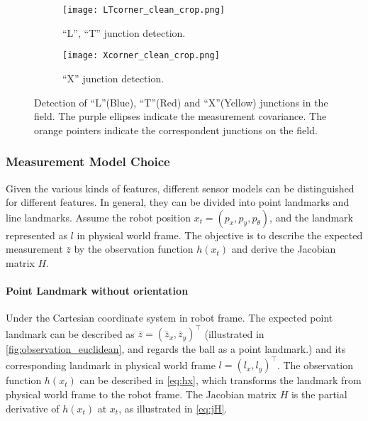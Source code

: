 \begin{figure}[h!]
  \hspace*{\fill}
  \begin{subfigure}[b]{0.4\textwidth}
    \texttt{[image: LTcorner\_clean\_crop.png]}
    \caption{``L'', ``T'' junction detection.}
    \label{fig:LT}
  \end{subfigure}
  \hspace*{\fill}
  \begin{subfigure}[b]{0.381\textwidth}
    \texttt{[image: Xcorner\_clean\_crop.png]}
    \caption{``X'' junction detection.}
    \label{fig:X}
  \end{subfigure}
  \hspace*{\fill}
 \caption[Detection of ``L'', ``T'' and ``X'' junction in the field.]{Detection of ``L''(Blue), ``T''(Red) and ``X''(Yellow) junctions in the field. The purple ellipses indicate the measurement covariance. The orange pointers indicate the correspondent junctions on the field.}
  \label{fig:txcorner}
\end{figure}


\subsubsection{Measurement Model Choice}\label{subsub:sensorModelChoice}
Given the various kinds of features, different sensor models can be distinguished for different features. In general, they can be divided into point landmarks and line landmarks. Assume the robot position $x_t = (p_x, p_y, p_{\theta})$, and the landmark represented as $l$ in physical world frame. The objective is to describe the expected measurement $\bar{z}$ by the observation function $h(x_t)$ and derive the Jacobian matrix $H$.
\paragraph{Point Landmark without orientation}\label{par:pointLandmark}
Under the Cartesian coordinate system in robot frame. The expected point landmark can be described as $\bar{z} = (\bar{z}_x, \bar{z}_y)^\top$ (illustrated in \autoref{fig:observation_euclidean}, and regards the ball as a point landmark.) and its corresponding landmark in physical world frame $l = (l_x, l_y)^\top$. The observation function $h(x_t)$ can be described in \autoref{eq:hx}, which transforms the landmark from physical world frame to the robot frame. The Jacobian matrix $H$ is the partial derivative of $h(x_t)$ at $x_t$, as illustrated in \autoref{eq:jH}. 

